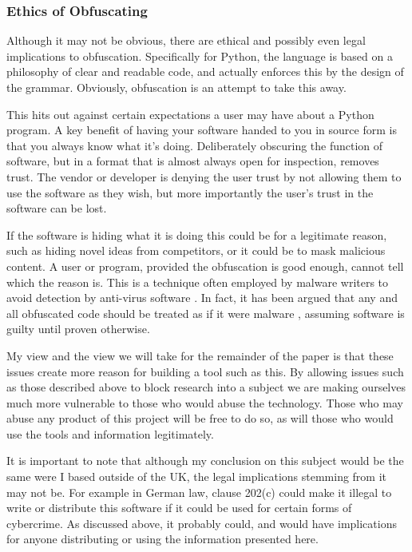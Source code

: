 \documentclass{report}
\begin{document}
\subsubsection{Ethics of Obfuscating}

Although it may not be obvious, there are ethical and possibly even legal implications to obfuscation.
Specifically for Python, the language is based on a philosophy of clear and readable code, and actually
enforces this by the design of the grammar. Obviously, obfuscation is an attempt to take this away.

This hits out against certain expectations a user may have about a Python program. A key benefit of having your
software handed to you in source form is that you always know what it's doing. Deliberately obscuring the
function of software, but in a format that is almost always open for inspection, removes trust. The vendor or developer is
denying the user trust by not allowing them to use the software as they wish, but more importantly the user's
trust in the software can be lost.

If the software is hiding what it is doing this could be for a legitimate reason, such as hiding novel ideas
from competitors, or it could be to mask malicious content. A user or program, provided the obfuscation is
good enough, cannot tell which the reason is. This is a technique often employed by malware
writers to avoid detection by anti-virus software \cite{dycodeobf}. In fact, it has been argued that any and
all obfuscated code should be treated as if it were malware \cite{noobf}, assuming software is guilty until
proven otherwise.

My view and the view we will take for the remainder of the paper is that these issues create more reason for
building a tool such as this. By allowing issues such as those described above to block research into a subject
we are making ourselves much more vulnerable to those who would abuse the technology. Those who may abuse any
product of this project will be free to do so, as will those who would use the tools and information legitimately.

It is important to note that although my conclusion on this subject would be the same were I based outside of
the UK, the legal implications stemming from it may not be. For example in German law, clause 202(c) \cite{202c}
could make it illegal to write or distribute this software if it could be used for
certain forms of cybercrime. As discussed above, it probably could, and would have implications for anyone distributing
or using the information presented here.
\end{document}
